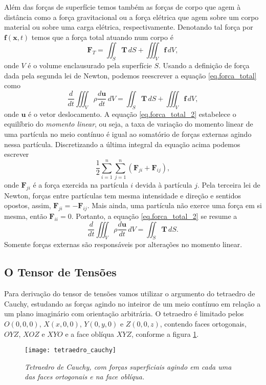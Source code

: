 Al\'em das for\c{c}as de superf\'icie temos tamb\'em as for\c{c}as de corpo que agem \`a dist\^ancia como a for\c{c}a gravitacional ou a for\c{c}a el\'etrica que agem sobre um corpo material ou sobre uma carga el\'etrica, respectivamente. Denotando tal for\c{c}a por $\mathbf{f}(\mathbf{x},t)$ temos que a for\c{c}a total atuando num corpo \'e
\begin{equation}\label{eq.forca_total}
\mathbf{F}_T=\iint_S\mathbf{T}\,dS+\iiint_V\mathbf{f}\,dV,
\end{equation}
onde $V$ \'e o volume enclausurado pela superf\'icie $S$. Usando a defini\c{c}\~ao de for\c{c}a dada pela segunda lei de Newton, podemos reescrever a equa\c{c}\~ao \ref{eq.forca_total} como
\begin{equation}\label{eq.forca_total_2}
\frac{d}{dt}\iiint_V\rho\frac{d\mathbf{u}}{dt}\,dV=\iint_S\mathbf{T}\,dS+\iiint_V\mathbf{f}\,dV,
\end{equation}
onde $\mathbf{u}$ \'e o vetor deslocamento. A equa\c{c}\~ao \ref{eq.forca_total_2} estabelece o equil\'ibrio do \textit{momento linear}, ou seja, a taxa de varia\c{c}\~ao do momento linear de uma part\'icula no meio cont\'inuo \'e igual ao somat\'orio de for\c{c}as externas agindo nessa part\'icula. Discretizando a \'ultima integral da equa\c{c}\~ao acima podemos escrever
\begin{equation*}
\frac{1}{2}\sum_{i=1}^n\sum_{j=1}^n(\mathbf{F}_{ji}+\mathbf{F}_{ij}),
\end{equation*}
onde $\mathbf{F}_{ji}$ \'e a for\c{c}a exercida na part\'icula $i$ devida \`a part\'icula $j$. Pela terceira lei de Newton, for\c{c}as entre part\'iculas tem mesma intensidade e dire\c{c}\~ao e sentidos opostos, assim, $\mathbf{F}_{ji}=-\mathbf{F}_{ij}$. Mais ainda, uma part\'icula n\~ao exerce uma for\c{c}a em si mesma, ent\~ao $\mathbf{F}_{ii}=0$. Portanto, a equa\c{c}\~ao \ref{eq.forca_total_2} se resume a
\begin{equation*}
\frac{d}{dt}\iiint_V\rho\frac{d\mathbf{u}}{dt}\,dV=\iint_S\mathbf{T}\,dS.
\end{equation*}
Somente for\c{c}as externas s\~ao respons\'aveis por altera\c{c}\~oes no momento linear.

\subsection{O Tensor de Tens\~oes}\label{sec.tensor_tensoes}

Para deriva\c{c}\~ao do tensor de tens\~oes vamos utilizar o argumento do tetraedro de Cauchy, estudando as for\c{c}as agindo no inteiror de um meio cont\'inuo em rela\c{c}\~ao a um plano imagin\'ario com orienta\c{c}\~ao arbitr\'aria. O tetraedro \'e limitado pelos $O(0,0,0)$, $X(x,0,0)$, $Y(0,y,0)$ e $Z(0,0,z)$, contendo faces ortogonais, $OYZ$, $XOZ$ e $XYO$ e a face obl\'iqua $XYZ$, conforme a figura \ref{fig.tetraedro}.
\begin{figure}
\centering
\texttt{[image: tetraedro\_cauchy]}
\caption{\textit{Tetraedro de Cauchy, com for\c{c}as superficiais agindo em cada uma das faces ortogonais e na face obl\'iqua.}}
\label{fig.tetraedro}
\end{figure}

